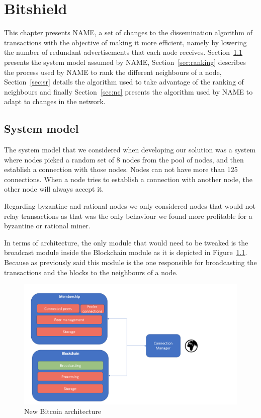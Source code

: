 \chapter{Bitshield}
\label{chap:arc}
This chapter presents NAME, a set of changes to the dissemination algorithm of transactions with the objective of making it more efficient, namely by lowering the number of redundant advertisements that each node receives.
Section~\ref{sec:sm} presents the system model assumed by NAME, Section~\ref{sec:ranking} describes the process used by NAME to rank the different neighbours of a node, Section~\ref{sec:sr} details the algorithm used to take advantage of the ranking of neighbours and finally Section~\ref{sec:nc} presents the algorithm used by NAME to adapt to changes in the network.


\section{System model}
\label{sec:sm}

The system model that we considered when developing our solution was a system where nodes picked a random set of 8 nodes from the pool of nodes, and then establish a connection with those nodes. Nodes can not have more than 125 connections. When a node tries to establish a connection with another node, the other node will always accept it.

Regarding byzantine and rational nodes we only considered nodes that would not relay transactions as that was the only behaviour we found more profitable for a byzantine or rational miner.

In terms of architecture, the only module that would need to be tweaked is the broadcast module inside the Blockchain module as it is depicted in Figure~\ref{fig:arch}. Because as previously said this module is the one responsible for broadcasting the transactions and the blocks to the neighbours of a node.

\begin{figure}[h]
\centering
\includegraphics[scale=0.4]{figs/Architecture.png}
\caption{New Bitcoin architecture}
\label{fig:arch}
\end{figure}

